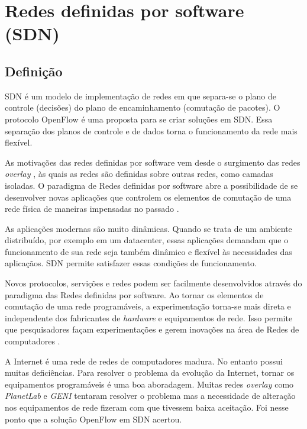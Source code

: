 \section{Redes definidas por software (SDN)}


\subsection{Definição}
SDN é um modelo de implementação de redes em que separa-se o plano de controle
(decisões) do plano de encaminhamento (comutação de pacotes). 
O protocolo OpenFlow \citep{nick2008openflow} é uma proposta para se 
criar soluções em SDN. 
Essa separação dos planos de controle e de dados torna o funcionamento da
rede mais flexível.

As motivações das redes definidas por software vem desde o surgimento das 
redes \emph{overlay} \citep{clark2006overlay}, às quais as redes são definidas
sobre outras redes, como camadas isoladas.
O paradigma de Redes definidas por software abre a possibilidade de se 
desenvolver novas aplicações que controlem os elementos de comutação de uma
rede física de maneiras impensadas no passado \citep{guedes2012redes}.

As aplicações modernas são muito dinâmicas. 
Quando se trata de um ambiente distribuído, por exemplo em um datacenter, 
essas aplicações demandam que o funcionamento de sua rede seja também 
dinâmico e flexível às necessidades das aplicaçãos. 
SDN permite satisfazer essas condições de funcionamento. 

Novos protocolos, servições e redes podem ser facilmente desenvolvidos através
do paradigma das Redes definidas por software.
Ao tornar os elementos de comutação de uma rede programáveis, a 
experimentação torna-se mais direta e independente dos fabricantes de 
\emph{hardware} e equipamentos de rede. 
Isso permite que pesquisadores façam experimentações e gerem inovações 
na área de Redes de computadores \citep{nick2008openflow}.

A Internet é uma rede de redes de computadores madura. 
No entanto possui muitas deficiências. 
Para resolver o problema da evolução da Internet, tornar os equipamentos 
programáveis é uma boa aboradagem.
Muitas redes \emph{overlay} como \emph{PlanetLab} 
\citep{peterson2006experiences} e \emph{GENI} \citep{berman2014geni} tentaram
resolver o problema mas a necessidade de alteração nos equipamentos de rede
fizeram com que tivessem baixa aceitação.
Foi nesse ponto que a solução OpenFlow em SDN acertou.


